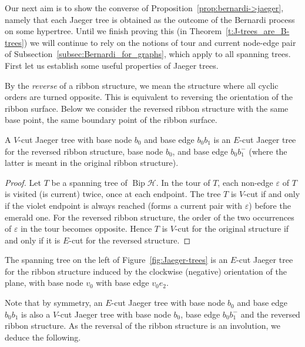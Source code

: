\documentclass[ALCO,ThmDefs,Unicode,epreuves]{cedram}
\newcommand{\HH}{\mathcal H}
\DeclareMathOperator{\bip}{Bip}
\begin{document}
Our next aim is to show the converse of Proposition~\ref{prop:bernardi->jaeger}, namely that each Jaeger tree is obtained as the outcome of the Bernardi process on some hypertree. Until we finish proving this (in Theorem~\ref{t:J-trees_are_B-trees}) we will continue to rely on the notions of tour and current node-edge pair of Subsection~\ref{subsec:Bernardi_for_graphs}, which apply to all spanning trees. First let us establish some useful properties of Jaeger trees. 

By the \emph{reverse} of a ribbon structure, we mean the structure where all cyclic orders are turned opposite. This is equivalent to reversing the orientation of the ribbon surface. Below we consider the reversed ribbon structure with the same base point, \ie the same boundary point of the ribbon surface.

\begin{lemma}\label{l:emerald_tree_is_also_violet}
A $V$-cut Jaeger tree with base node $b_0$ and base edge $b_0b_1$ is an $E$-cut Jaeger tree for the reversed ribbon structure, base node $b_0$, and base edge $b_0b_1^-$ (where the latter is meant in the original ribbon structure).
\end{lemma}

\begin{proof} 
Let $T$ be a spanning tree of $\bip\HH$. In the tour of $T$, each non-edge $\varepsilon$ of $T$ is visited (\ie is current) twice, once at each endpoint. The tree $T$ is $V$-cut if and only if the violet endpoint is always reached (\ie forms a current pair with $\varepsilon$) before the emerald one. For the reversed ribbon structure, the order of the two occurrences of $\varepsilon$ in the tour becomes opposite. Hence $T$ is $V$-cut for the original structure if and only if it is $E$-cut for the reversed structure.
\end{proof}

\begin{exam} 
The spanning tree on the left of Figure~\ref{fig:Jaeger-trees} is an $E$-cut Jaeger tree for the ribbon structure induced by the clockwise (negative) orientation of the plane, with base node $v_0$ with base edge $v_0e_2$.
\end{exam}

Note that by symmetry, an $E$-cut Jaeger tree with base node $b_0$ and base edge $b_0b_1$ is also a $V$-cut Jaeger tree with base node $b_0$, base edge $b_0b_1^-$ and the reversed ribbon structure. As the reversal of the ribbon structure is an involution, we deduce the following.
\end{document}

